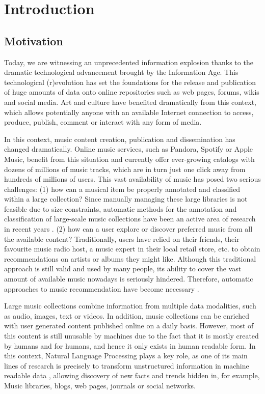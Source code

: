
\chapter{Introduction}
\label{sec:intro}

\section{Motivation}
\label{sec:intro:motivation}

Today, we are witnessing an unprecedented information explosion thanks to the dramatic technological advancement brought by the Information Age. This technological (r)evolution has set the foundations for the release and publication of huge amounts of data onto online repositories such as web pages, forums, wikis and social media. Art and culture have benefited dramatically from this context, which allows potentially anyone with an available Internet connection to access, produce, publish, comment or interact with any form of media. 

In this context, music content creation, publication and dissemination has changed dramatically. Online music services, such as Pandora, Spotify or Apple Music, benefit from this situation and currently offer ever-growing catalogs with dozens of millions of music tracks, which are in turn just one click away from hundreds of millions of users. This vast availability of music has posed two serious challenges: (1) how can a musical item be properly annotated and classified within a large collection? Since manually managing these large libraries is not feasible due to size constraints, automatic methods for the annotation and classification of large-scale music collections have been an active area of research in recent years \cite{schedl2014music}. (2) how can a user explore or discover preferred music from all the available content? Traditionally, users have relied on their friends, their favourite music radio host, a music expert in their local retail store, etc. to obtain recommendations on artists or albums they might like. Although this traditional approach is still valid and used by many people, its ability to cover the vast amount of available music nowadays is seriously hindered. Therefore, automatic approaches to music recommendation have become necessary \cite{celma2008new}.

Large music collections combine information from multiple data modalities, such as audio, images, text or videos. In addition, music collections can be enriched with user generated content published online on a daily basis. However, most of this content is still unusable by machines due to the fact that it is mostly created by humans and for humans, and hence it only exists in human readable form. In this context, Natural Language Processing plays a key role, as one of its main lines of research is precisely to transform unstructured information in machine readable data \cite{cowie1996information}, allowing discovery of new facts and trends hidden in, for example, Music libraries, blogs, web pages, journals or social networks.

